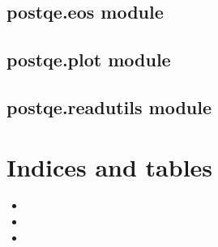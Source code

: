 \documentclass[letterpaper,10pt,english]{sphinxmanual}
\begin{document}
\section{postqe.eos module}
\label{postqe:postqe-eos-module}

\section{postqe.plot module}
\label{postqe:postqe-plot-module}

\section{postqe.readutils module}
\label{postqe:postqe-readutils-module}

\chapter{Indices and tables}
\label{index:indices-and-tables}\begin{itemize}
\item {} 

\item {} 

\item {} 

\end{itemize}



\renewcommand{\indexname}{Index}
\printindex
\end{document}
